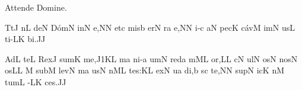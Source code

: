 
\beginhymn Attende Domine.

\nosolesmescustos
{}\Internote
{}
\initiumgregorianum
{}%
\sgn {}Tt\punctum J\egn
{}n\punctum L\egn
\sgn de{}\punctum N\egn
\spatium
\sgn D{\'o}m\engl{}\punctum N\egn
\sgn {}in\punctum N\egn
\sgn {}e,\punctum N\augmentum N\egn
\spatium
\sgn {}et\punctum c\egn
\spatium
\sgn mis\engl{}\punctum b\egn
\sgn {}er\punctum N\egn
{}r\punctum a\egn
\sgn {}e,\punctum N\augmentum N\egn
\spatium
\divisiominor
\spatium
{}i-\punctum c\egn
\sgn {}a{}\punctum N\egn
\spatium
\sgn pec\punctum K\egn
\sgn c{\'a}v\punctum M\egn
\sgn {}im\punctum N\egn
\sgn {}us\punctum L\egn
\spatium
\sgn t{i}-\clivis LK\egn
\sgn bi.\punctum J\augmentum J\egn
\spatium
\Finisgregoriana

\medskip

\nosolesmescustos
{}\Internote
{}
\initiumgregorianum
{}%
\sgn {}Ad\punctum L\egn
\spatium
\sgn te{}\punctum L\egn
\spatium
\sgn Rex\punctum J\egn
\spatium
\sgn s{u}m\punctum K\egn
\sgn me,\episem J1\pes KL\egn
\spatium
{}m\punctum a\egn
\sgn ni-\punctum a\egn
\sgn {}um\punctum N\egn
\spatium
\sgn red\punctum a\egn
{}m\clivis ML\egn
{}o{r,}\punctum L\augmentum L\egn
\spatium
\divisiominor
\spatium
{}c\punctum N\egn
\sgn {}ul\punctum N\egn
\sgn {}os\punctum N\egn
\spatium
\sgn n{o}s\punctum N\egn
{}os\punctum L\augmentum L\egn
\spatium
\custos M
\lineaproxima
\sgn sub\punctum M\egn
\sgn lev\punctum N\egn
{}m\punctum a\egn
\sgn {}us\punctum N\egn
\spatium
{}n\clivis ML\egn
\sgn te{s:}\punctum K\augmentum L\egn
\spatium
\divisiominor
\spatium
\sgn {}ex\punctum N\egn
{}u\punctum a\egn
\sgn di,\punctum b\egn
\spatium
{}s\punctum c\egn
\sgn te,\punctum N\augmentum N\egn
\spatium
\sgn sup\punctum N\egn
{}ic\punctum K\egn
{}n\punctum M\egn
\sgn tum\punctum L\egn
\spatium
{}-\clivis LK\egn
\sgn ce{s.}\punctum J\augmentum J\egn
\Finisgregoriana

\bigskip

\beginlyrics

